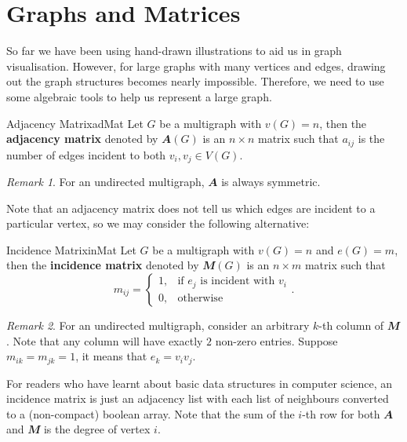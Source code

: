 \documentclass[math]{amznotes}
\theoremstyle{remark}
\newtheorem*{remark}{Remark}
\begin{document}
\section{Graphs and Matrices}
So far we have been using hand-drawn illustrations to aid us in graph visualisation. However, for large graphs with many vertices and edges, drawing out the graph structures becomes nearly impossible. Therefore, we need to use some algebraic tools to help us represent a large graph.
\begin{dfnbox}{Adjacency Matrix}{adMat}
    Let $G$ be a multigraph with $v(G) = n$, then the {\color{red} \textbf{adjacency matrix}} denoted by $\mathbfit{A}(G)$ is an $n \times n$ matrix such that $a_{ij}$ is the number of edges incident to both $v_i, v_j \in V(G)$.
\end{dfnbox}
\begin{notebox}
    \begin{remark}
        For an undirected multigraph, $\mathbfit{A}$ is always symmetric.
    \end{remark}
\end{notebox}
Note that an adjacency matrix does not tell us which edges are incident to a particular vertex, so we may consider the following alternative:
\begin{dfnbox}{Incidence Matrix}{inMat}
    Let $G$ be a multigraph with $v(G) = n$ and $e(G) = m$, then the {\color{red} \textbf{incidence matrix}} denoted by $\mathbfit{M}(G)$ is an $n \times m$ matrix such that
    \begin{equation*}
        m_{ij} = \begin{cases}
            1, &\textrm{if } e_j \textrm{ is incident with } v_i \\
            0, &\textrm{otherwise}
        \end{cases}.
    \end{equation*}
\end{dfnbox}
\begin{notebox}
    \begin{remark}
        For an undirected multigraph, consider an arbitrary $k$-th column of $\mathbfit{M}$. Note that any column will have exactly $2$ non-zero entries. Suppose $m_{ik} = m_{jk} = 1$, it means that $e_k = v_iv_j$.
    \end{remark}
\end{notebox}
For readers who have learnt about basic data structures in computer science, an incidence matrix is just an adjacency list with each list of neighbours converted to a (non-compact) boolean array. Note that the sum of the $i$-th row for both $\mathbfit{A}$ and $\mathbfit{M}$ is the degree of vertex $i$. 
\end{document}
